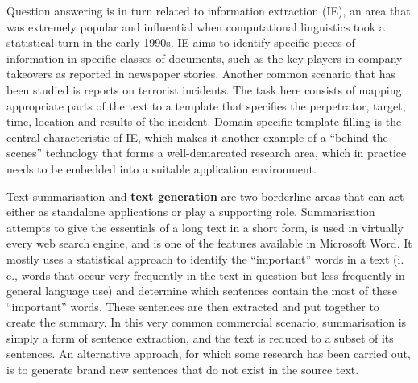 \begin{multicols}{2}
Question answering is in turn related to information extraction (IE), an area that was extremely popular and influential when computational linguistics took a statistical turn in the early 1990s. IE aims to identify specific pieces of information in specific classes of documents, such as the key players in company takeovers as reported in newspaper stories. Another common scenario that has been studied is reports on terrorist incidents. The task here consists of mapping appropriate parts of the text to a template that specifies the perpetrator, target, time, location and results of the incident. Domain-specific template-filling is the central characteristic of IE, which makes it another example of a “behind the scenes” technology that forms a well-demarcated research area, which in practice needs to be embedded into a suitable application environment.

    Text summarisation and \textbf{text generation} are two borderline areas that can act either as standalone applications or play a supporting role. Summarisation attempts to give the essentials of a long text in a short form, is used in virtually every web search engine, and is one of the features available in Microsoft Word. It mostly uses a statistical approach to identify the “important” words in a text (i.\,e., words that occur very frequently in the text in question but less frequently in general language use) and determine which sentences contain the most of these “important” words. These sentences are then extracted and put together to create the summary. In this very common commercial scenario, summarisation is simply a form of sentence extraction, and the text is reduced to a subset of its sentences. An alternative approach, for which some research has been carried out, is to generate brand new sentences that do not exist in the source text.



\end{multicols}
